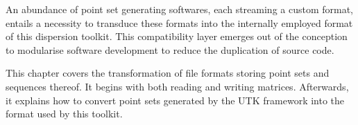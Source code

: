 %
An abundance of point set generating softwares, each streaming a custom format, entails a necessity to transduce these formats into the internally employed format of this dispersion toolkit. This compatibility layer emerges out of the conception to modularise software development to reduce the duplication of source code.

This chapter covers the transformation of file formats storing point sets and sequences thereof. It begins with both reading and writing matrices. Afterwards, it explains how to convert point sets generated by the UTK framework into the format used by this toolkit.


\clearpage
